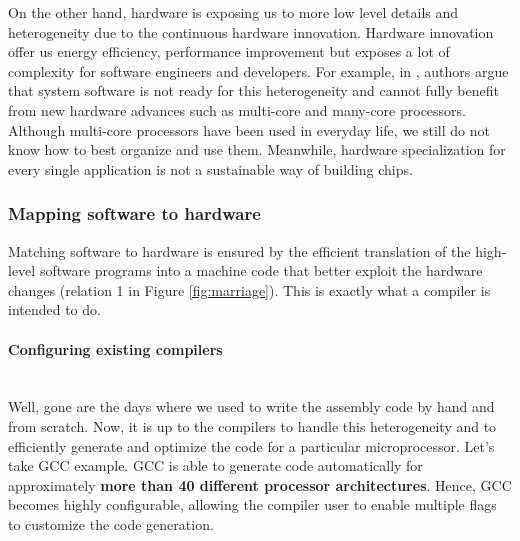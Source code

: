 On the other hand, hardware is exposing us to more low level details and heterogeneity due to the continuous hardware innovation. 
Hardware innovation offer us energy efficiency, performance improvement but exposes a lot of complexity for software engineers and developers.
For example, in \cite{he2010computer}, authors argue that system software is not ready for this heterogeneity and cannot fully benefit from new hardware advances such as multi-core and many-core processors. Although multi-core processors have been used in everyday life, we still do not know how to best organize and use them. 
Meanwhile, hardware specialization for every single application is not a sustainable way of building chips.

\subsubsection{Mapping software to hardware}
\label{Mapping software to hardware}
Matching software to hardware is ensured by the efficient translation of the high-level software programs into a machine code that better exploit the hardware changes (relation 1 in Figure \ref{fig:marriage}). This is exactly what a compiler is intended to do.

\paragraph{Configuring existing compilers}~\\ 
Well, gone are the days where we used to write the assembly code by hand and from scratch. Now, it is up to the compilers to handle this heterogeneity and to efficiently generate and optimize the code for a particular microprocessor. 
Let's take GCC example. GCC is able to generate code automatically for approximately \textbf{more than 40 different processor architectures}. Hence, GCC becomes highly configurable, allowing the compiler user to enable multiple flags to customize the code generation.

